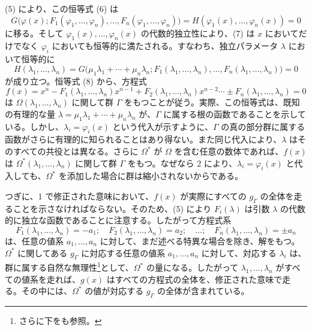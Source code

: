 (5) により、この恒等式 (6) は
\begin{equation}\tag{7}
G\bigl(\varphi(x);F_1(\varphi_1,
\ldots,\varphi_n),\ldots,F_n(\varphi_1,
\ldots,\varphi_n)\bigr)
=H(\varphi_1(x),\ldots,\varphi_n(x))=0
\end{equation}
に移る。そして $\varphi_1(x),\ldots,\varphi_n(x)$ の代数的独立性により、(7) は $x$ においてだけでなく $\varphi_i$ においても恒等的に満たされる。すなわち、独立パラメータ $\lambda$ において恒等的に
\begin{equation}\tag{8}
H(\lambda_1,
\ldots,\lambda_n)=G\bigl(\mu_1\lambda_1+\cdots+\mu_n\lambda_n;
F_1(\lambda_1,
\ldots,\lambda_n),\ldots,F_n(\lambda_1,
\ldots,\lambda_n)\bigr)=0
\end{equation}
が成り立つ。恒等式 (8) から、方程式
\begin{equation}\tag{9}
f(x)=x^n-F_1(\lambda_1,
\ldots,\lambda_n)x^{n-1}+F_2(\lambda_1,
\ldots,\lambda_n)x^{n-2}\cdots \pm F_n(\lambda_1,
\ldots,\lambda_n)=0
\end{equation}
は $\Omega(\lambda_1,
\ldots,\lambda_n)$ に関して群 $\Gamma$ をもつことが従う。実際、この恒等式は、既知の有理的な量 $\lambda=\mu_1\lambda_1+
\cdots+
\mu_n\lambda_n$ が、$\Gamma$ に属する根の函数であることを示している。しかし、$\lambda_i=\varphi_i(x)$ という代入が示すように、$\Gamma$ の真の部分群に属する函数がさらに有理的に知られることはあり得ない。また同じ代入により、$\lambda$ はそのすべての共役とは異なる。さらに $\Omega^*$ が $\Omega$ を含む任意の数体であれば、$f(x)$ は $\Omega^*(\lambda_1,
\ldots,\lambda_n)$ に関して群 $\Gamma$ をもつ。なぜなら 2 により、$\lambda_i=\varphi_i(x)$ と代入しても、$\Omega^*$ を添加した場合に群は縮小されないからである。

つぎに、1 で修正された意味において、$f(x)$ が実際にすべての $g_\Gamma$ の全体を走ることを示さなければならない。そのため、(5) により $F_i(\lambda)$ は引数 $\lambda$ の代数的に独立な函数であることに注意する。したがって方程式系
\begin{equation}\tag{10}
F_1(\lambda_1,
\ldots,\lambda_n)=-a_1;\quad F_2(\lambda_1,
\ldots,\lambda_n)=a_2;\quad\ldots;\quad F_n(\lambda_1,
\ldots,\lambda_n)=\pm a_n
\end{equation}
は、任意の値系 $a_1,
\ldots,a_n$ に対して、まだ述べる特異な場合を除き、解をもつ。$\Omega^*$ に関してある $g_\Gamma$ に対応する任意の値系 $a_1,
\ldots,a_n$ に対して、対応する $\lambda_i$ は、群に属する自然な無理性\footnote{さらに下をも参照。}として、$\Omega^*$ の量になる。したがって $\lambda_1,
\ldots,\lambda_n$ がすべての値系を走れば、$g(x)$ はすべての方程式の全体を、修正された意味で走る。その中には、$\Omega^*$ の値が対応する $g_\Gamma$ の全体が含まれている。

